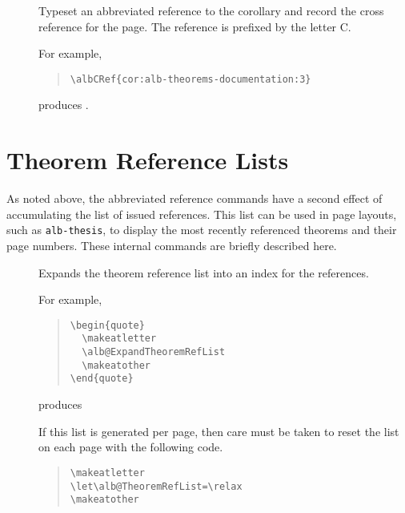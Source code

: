 \documentclass[11pt,a4paper,oneside,titlepage]{alb-corp}
\begin{document}
\begin{description}
\item[] Typeset an abbreviated
  reference to the  corollary and record the cross
  reference for the page.  The reference is prefixed by the letter C.

  For example,
  \begin{quote}
\begin{verbatim}
\albCRef{cor:alb-theorems-documentation:3}
\end{verbatim}
  \end{quote}
  produces .
\end{description}




\section{Theorem Reference Lists}
\label{sec:alb-theorems-documentation:theorem-refer-lists}

As noted above, the abbreviated reference commands have a second effect
of accumulating the list of issued references.  This list can be used in
page layouts, such as \texttt{alb-thesis}, to display the most recently
referenced theorems and their page numbers.  These internal commands are
briefly described here.

\begin{description}
\item[] Expands the theorem
  reference list into an index for the references.

  For example,
  \begin{quote}
\begin{verbatim}
\begin{quote}
  \makeatletter
  \alb@ExpandTheoremRefList
  \makeatother
\end{quote}
\end{verbatim}
  \end{quote}
  produces
  \begin{quote}
    \makeatletter%
    \alb@ExpandTheoremRefList%
    \makeatother%
  \end{quote}

  If this list is generated per page, then care must be taken to reset
  the list on each page with the following code.
  \begin{quote}
\begin{verbatim}
\makeatletter
\let\alb@TheoremRefList=\relax
\makeatother
\end{verbatim}
  \end{quote}
\end{description}
\end{document}
